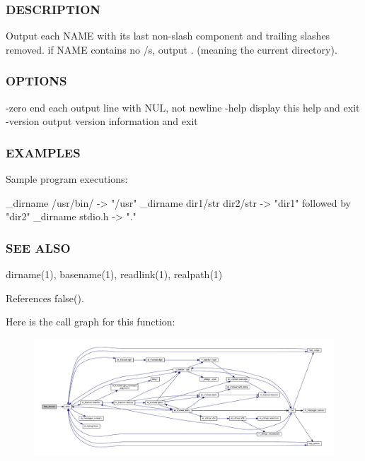 \subsubsection*{D\+E\+S\+C\+R\+I\+P\+T\+I\+ON}

Output each N\+A\+ME with its last non-\/slash component and trailing slashes removed. if N\+A\+ME contains no /\textquotesingle{}s, output \textquotesingle{}.\textquotesingle{} (meaning the current directory).

\subsubsection*{O\+P\+T\+I\+O\+NS}

-\/zero end each output line with N\+UL, not newline -\/help display this help and exit -\/version output version information and exit

\subsubsection*{E\+X\+A\+M\+P\+L\+ES}

\begin{DoxyVerb}Sample program executions:

  _dirname /usr/bin/          -> "/usr"
  _dirname dir1/str dir2/str  -> "dir1" followed by "dir2"
  _dirname stdio.h            -> "."
\end{DoxyVerb}


\subsubsection*{S\+EE A\+L\+SO}

dirname(1), basename(1), readlink(1), realpath(1) 

References false().

Here is the call graph for this function\+:
\nopagebreak
\begin{figure}[H]
\begin{center}
\leavevmode
\includegraphics[width=350pt]{__dirname_8f90_a948f25e883089a17879425d9c31c64cd_cgraph}
\end{center}
\end{figure}
